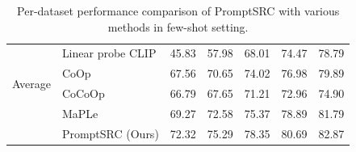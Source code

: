 \begin{table}[t!]
{\begin{tabular}{ll|ccccc}
\midrule
\multirow{4}{*}{Average}       & Linear probe CLIP       & 45.83	&57.98	&68.01	&74.47&	78.79\\
                               & CoOp                    & 67.56	&70.65	&74.02	&76.98	&79.89\\
                               & CoCoOp                & 66.79&	67.65	&71.21&	72.96	&74.90\\
                                                              & MaPLe                  & 69.27	&72.58	&75.37&	78.89&	81.79\\
                               \rowcolor{tabhighlight} &  PromptSRC (Ours)              & 72.32	&75.29	&78.35	&80.69	&82.87\\


\bottomrule
\end{tabular}
}
    \caption{\small Per-dataset performance comparison of PromptSRC with various methods in few-shot setting.}
    \label{tab_appendix:few_shot_experiments}
\vspace{-5mm}
\end{table}
